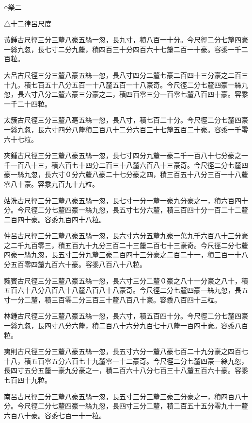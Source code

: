 
\begin{pinyinscope}
○樂二

△十二律呂尺度

黃鍾古尺徑三分三釐八豪五絲一忽，長九寸，積八百一十分。今尺徑二分七釐四豪一絲九忽，長七寸二分九釐，積四百三十分四百六十七釐二百一十豪。容黍一千二百粒。

大呂古尺徑三分三釐八豪五絲一忽，長八寸四分二釐七豪二百四十三分豪之二百三十九，積七百五十八分五百一十八釐五百一十八豪奇。今尺徑二分七釐四豪一絲九忽，長六寸八分二釐六豪三分豪之二，積四百零三分一百零七釐八百四十豪。容黍一千二十四粒。

太簇古尺徑三分三釐八亳五絲一忽，長八寸，積七百二十分。今尺徑二分七釐四豪一絲九忽，長六寸四分八釐積三百八十二分六百三十七釐五百二十豪。容黍一千零六十七粒。

夾鍾古尺徑三分三釐八豪五絲一忽，長七寸四分九釐一豪二千一百八十七分豪之一千一百八十三，積六百七十四分二百三十八釐六百八十三豪奇。今尺徑二分七釐四豪一絲九忽，長六寸０分六釐八豪二十七分豪之四，積三百五十八分三百一十八釐零八十豪。容黍九百九十九粒。

姑洗古尺徑三分三釐八豪五絲一忽，長七寸一分一釐一豪九分豪之一，積六百四十分。今尺徑二分七釐四豪一絲九忽，長五寸七分六釐，積三百四十分一百二十二釐二百四十豪。容黍九百四十八粒。

仲呂古尺徑三分三釐八豪五絲一忽，長六寸六分五釐九豪一萬九千六百八十三分豪之二千九百零三，積五百九十九分三百二十三釐二百七十三豪奇。今尺徑二分七釐四豪一絲九忽，長五寸三分九釐三豪二百四十三分豪之二百二十一，積三百一十八分五百零四釐九百六十豪。容黍八百八十八粒。

蕤賓古尺徑三分三釐八豪五絲一忽，長六寸三分二釐０豪之八十一分豪之八十，積五百六十八分八百八十八釐八百八十八豪奇。今尺徑二分七釐四豪一絲九忽，長五寸一分二釐，積三百零二分三百三十釐八百八十豪。容黍八百四十三粒。

林鍾古尺徑三分三釐八豪五絲一忽，長六寸，積五百四十分。今尺徑二分七釐四豪一絲九忽，長四寸八分六釐，積二百八十六分九百七十八釐一百四十豪。容黍八百粒。

夷則古尺徑三分三釐八豪五絲一忽，長五寸六分一釐八豪七百二十九分豪之四百七十八，積五百零五分六百七十九釐零一十二豪奇。今尺徑二分七釐四豪一絲九忽，長四寸五分五釐一豪九分豪之一，積二百六十八分七百三十八釐五百六十豪。容黍七百四十九粒。

南呂古尺徑三分三釐八豪五絲一忽，長五寸三分三釐三豪三分豪之一，積四百八十分。今尺徑二分七釐四豪一絲九忽，長四寸三分二釐，積二百五十五分零九十一釐六百八十豪。容黍七百一十一粒。


\end{pinyinscope}
